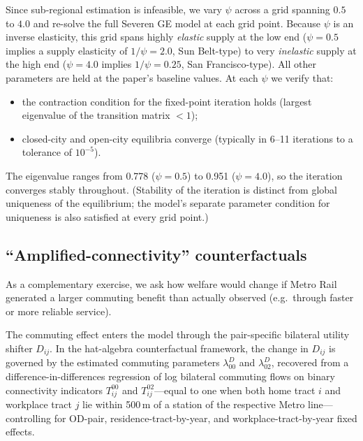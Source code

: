 \documentclass[12pt,a4paper]{article}
\begin{document}
Since sub-regional estimation is infeasible, we vary $\psi$ across a grid
spanning $0.5$ to $4.0$ and re-solve the full Severen GE model at each grid
point.  Because $\psi$ is an inverse elasticity, this grid spans highly
\emph{elastic} supply at the low end ($\psi = 0.5$ implies a supply elasticity
of $1/\psi = 2.0$, Sun Belt-type) to very \emph{inelastic} supply at the high
end ($\psi = 4.0$ implies $1/\psi = 0.25$, San Francisco-type).  All other
parameters are held at the paper's baseline values.  At each $\psi$ we verify
that:
%
\begin{itemize}[leftmargin=1.5em, itemsep=2pt]
  \item the contraction condition for the fixed-point iteration holds (largest
    eigenvalue of the transition matrix $< 1$);
  \item closed-city and open-city equilibria converge (typically in 6--11
    iterations to a tolerance of $10^{-5}$).
\end{itemize}
%
The eigenvalue ranges from 0.778 ($\psi = 0.5$) to 0.951 ($\psi = 4.0$), so the
iteration converges stably throughout.  (Stability of the iteration is distinct
from global uniqueness of the equilibrium; the model's separate parameter
condition for uniqueness is also satisfied at every grid point.)

\subsection{``Amplified-connectivity'' counterfactuals}
\label{sec:faster_transit}

As a complementary exercise, we ask how welfare would change if Metro Rail
generated a larger commuting benefit than actually observed (e.g.\ through
faster or more reliable service).

The commuting effect enters the model through the pair-specific bilateral
utility shifter $D_{ij}$.  In the hat-algebra counterfactual framework, the
change in $D_{ij}$ is governed by the estimated commuting parameters
$\lambda^{D}_{00}$ and $\lambda^{D}_{02}$, recovered from a
difference-in-differences regression of log bilateral commuting flows on binary
connectivity indicators $T^{00}_{ij}$ and $T^{02}_{ij}$---equal to one when both
home tract $i$ and workplace tract $j$ lie within 500\,m of a station of the
respective Metro line---controlling for OD-pair, residence-tract-by-year, and
workplace-tract-by-year fixed effects.
\end{document}
